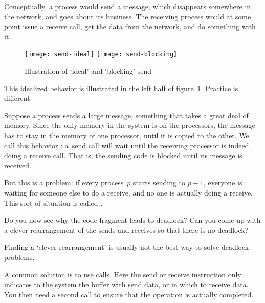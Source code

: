 Conceptually, a process would send a message, which disappears
somewhere in the network, and goes about its business.
The receiving process would at some point issue a receive call,
get the data from the network, and do something with it.
\begin{figure}[t]
  \leavevmode
  \texttt{[image: send-ideal]}\hfill
  \texttt{[image: send-blocking]}
  \caption{Illustration of `ideal' and `blocking' send}
  \label{fig:cw-send-blocking}
\end{figure}
This idealized behavior is illustrated in the left half of
figure~\ref{fig:cw-send-blocking}. Practice is different.

Suppose a process sends a large message, something that takes
a great deal of memory. Since the only memory in the system
is on the processors, the message has to stay in the memory 
of one processor, until it is copied to the other.
We call this behavior :
a~send call will wait until the receiving processor is
indeed doing a receive call. That is, the sending code is blocked
until its message is received.

But this is a problem: if every process~$p$ starts sending to $p-1$,
everyone is waiting for someone else to do a receive, and no one is
actually doing a receive. This sort of situation is called
.

\begin{exercise}
  Do you now see why the code fragment
  leads to deadlock? Can you come up with a clever rearrangement of the sends 
  and receives so that there is no deadlock?
\end{exercise}

Finding a `clever rearrangement' is usually not the best way to 
solve deadlock problems.
\begin{comment}
  One solution is to use \indextermsub{one-sided}{communication}.
  Here the idea is that:
  \begin{itemize}
  \item Each processor declares an area, called a `window', that is accessible to other
    pprocessors; and
  \item Other processors can then put data in another processor's window, or take data
    from it.
  \end{itemize}
  One-sided communication sounds attractive, but it is often easier and more efficient
\end{comment}
A common solution is
to use  calls. Here the send or receive instruction
only indicates to the system the buffer with send data, or in which to receive data. 
You then need a second call to ensure that the operation is actually completed.

